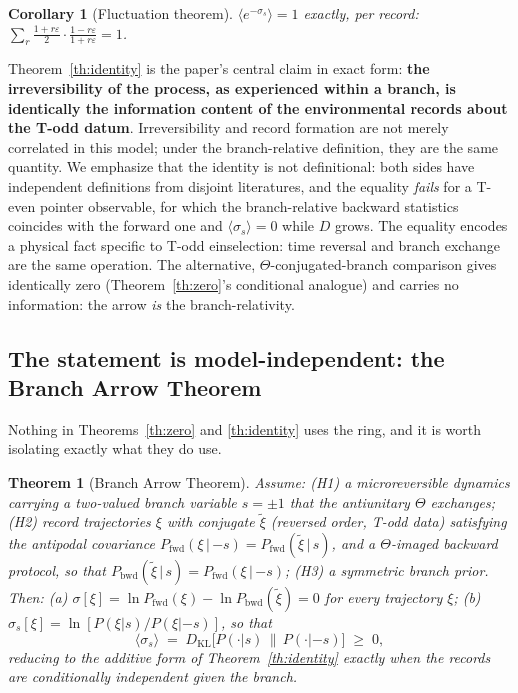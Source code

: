 \documentclass[11pt]{article}
\newtheorem{theorem}{Theorem}
\newtheorem{corollary}{Corollary}
\begin{document}
\begin{corollary}[Fluctuation theorem]
$\langle e^{-\sigma_s}\rangle = 1$ exactly, per record:
$\sum_r \frac{1+r\varepsilon}{2}\cdot\frac{1-r\varepsilon}{1+r\varepsilon} = 1$.
\end{corollary}

Theorem~\ref{th:identity} is the paper's central claim in exact form: \textbf{the irreversibility of the process, as experienced within a branch, is identically the information content of the environmental records about the T-odd datum}. Irreversibility and record formation are not merely correlated in this model; under the branch-relative definition, they are the same quantity. We emphasize that the identity is not definitional: both sides have independent definitions from disjoint literatures, and the equality \emph{fails} for a T-even pointer observable, for which the branch-relative backward statistics coincides with the forward one and $\langle\sigma_s\rangle=0$ while $D$ grows. The equality encodes a physical fact specific to T-odd einselection: time reversal and branch exchange are the same operation. The alternative, $\Theta$-conjugated-branch comparison gives identically zero (Theorem~\ref{th:zero}'s conditional analogue) and carries no information: the arrow \emph{is} the branch-relativity.



\subsection{The statement is model-independent: the Branch Arrow Theorem}
\label{sec:BAT}

Nothing in Theorems~\ref{th:zero} and \ref{th:identity} uses the ring, and it is worth isolating exactly what they do use.

\begin{theorem}[Branch Arrow Theorem]\label{th:BAT}
Assume: (H1) a microreversible dynamics carrying a two-valued branch variable $s = \pm 1$ that the antiunitary $\Theta$ exchanges; (H2) record trajectories $\xi$ with conjugate $\tilde\xi$ (reversed order, T-odd data) satisfying the antipodal covariance $P_{\mathrm{fwd}}(\xi\,|\,{-s}) = P_{\mathrm{fwd}}(\tilde\xi\,|\,s)$, and a $\Theta$-imaged backward protocol, so that $P_{\mathrm{bwd}}(\tilde\xi\,|\,s) = P_{\mathrm{fwd}}(\xi\,|\,{-s})$; (H3) a symmetric branch prior. Then: (a) $\sigma[\xi] = \ln P_{\mathrm{fwd}}(\xi) - \ln P_{\mathrm{bwd}}(\tilde\xi) = 0$ for every trajectory $\xi$; (b) $\sigma_s[\xi] = \ln[P(\xi|s)/P(\xi|{-s})]$, so that
\[ \langle\sigma_s\rangle \;=\; D_{\mathrm{KL}}\big[P(\cdot|s)\,\big\|\,P(\cdot|{-s})\big] \;\ge\; 0, \]
reducing to the additive form of Theorem~\ref{th:identity} exactly when the records are conditionally independent given the branch.
\end{theorem}
\end{document}
